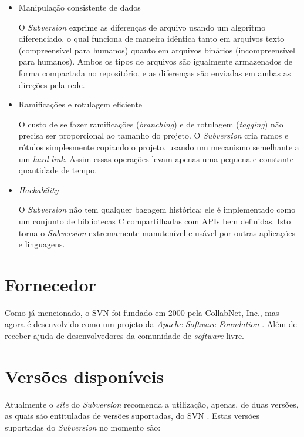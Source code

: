 \begin{itemize}
  \item Manipulação consistente de dados

  O \textit{Subversion} exprime as diferenças de arquivo usando um algoritmo diferenciado, o qual funciona de maneira idêntica tanto em arquivos texto (compreensível para humanos) quanto em arquivos binários (incompreensível para humanos). Ambos os tipos de arquivos são igualmente armazenados de forma compactada no repositório, e as diferenças são enviadas em ambas as direções pela rede.

  \item Ramificações e rotulagem eficiente

  O custo de se fazer ramificações (\textit{branching}) e de rotulagem (\textit{tagging}) não precisa ser proporcional ao tamanho do projeto. O \textit{Subversion} cria ramos e rótulos simplesmente copiando o projeto, usando um mecanismo semelhante a um \textit{hard-link}. Assim essas operações levam apenas uma pequena e constante quantidade de tempo.

  \item \textit{Hackability}

  O \textit{Subversion} não tem qualquer bagagem histórica; ele é implementado como um conjunto de bibliotecas C compartilhadas com APIs bem definidas. Isto torna o \textit{Subversion} extremamente manutenível e usável por outras aplicações e linguagens.

  \end{itemize}

\section{Fornecedor}

  Como já mencionado, o SVN foi fundado em 2000 pela CollabNet, Inc., mas agora é desenvolvido como um projeto da \textit{Apache Software Foundation} \cite{svn-site-home}. Além de receber ajuda de desenvolvedores da comunidade de \textit{software} livre.

\section{Versões disponíveis}

  Atualmente o \textit{site} do \textit{Subversion} recomenda a utilização, apenas, de duas versões, as quais são entituladas de versões suportadas, do SVN \cite{svn-site}. Estas versões suportadas do \textit{Subversion} no momento são:

